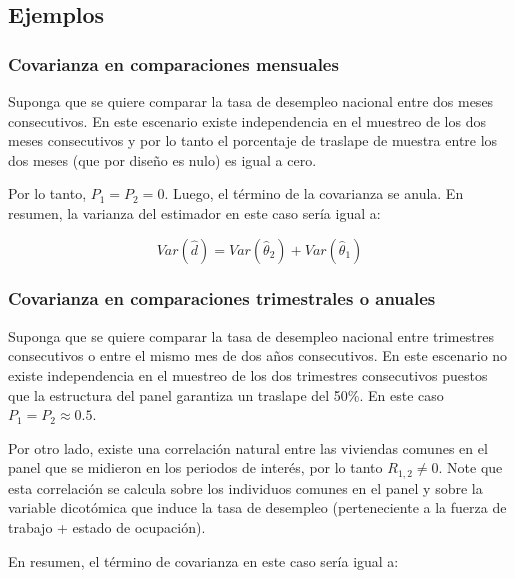 \documentclass[12pt,spanish,]{book}
\begin{document}
\hypertarget{ejemplos}{%
\subsection{Ejemplos}\label{ejemplos}}

\hypertarget{covarianza-en-comparaciones-mensuales}{%
\subsubsection*{Covarianza en comparaciones mensuales}\label{covarianza-en-comparaciones-mensuales}}

Suponga que se quiere comparar la tasa de desempleo nacional entre dos meses consecutivos. En este escenario existe independencia en el muestreo de los dos meses consecutivos y por lo tanto el porcentaje de traslape de muestra entre los dos meses (que por diseño es nulo) es igual a cero.

Por lo tanto, \(P_1 = P_2 = 0\). Luego, el término de la covarianza se anula. En resumen, la varianza del estimador en este caso sería igual a:

\[
Var(\hat{d}) 
= Var(\hat{\theta}_2) + Var(\hat{\theta}_1)
\]

\hypertarget{covarianza-en-comparaciones-trimestrales-o-anuales}{%
\subsubsection*{Covarianza en comparaciones trimestrales o anuales}\label{covarianza-en-comparaciones-trimestrales-o-anuales}}

Suponga que se quiere comparar la tasa de desempleo nacional entre trimestres consecutivos o entre el mismo mes de dos años consecutivos. En este escenario no existe independencia en el muestreo de los dos trimestres consecutivos puestos que la estructura del panel garantiza un traslape del 50\%. En este caso \(P_1 = P_2 \approx 0.5\).

Por otro lado, existe una correlación natural entre las viviendas comunes en el panel que se midieron en los periodos de interés, por lo tanto \(R_{1,2} \neq 0\). Note que esta correlación se calcula sobre los individuos comunes en el panel y sobre la variable dicotómica que induce la tasa de desempleo (perteneciente a la fuerza de trabajo + estado de ocupación).

En resumen, el término de covarianza en este caso sería igual a:
\end{document}
